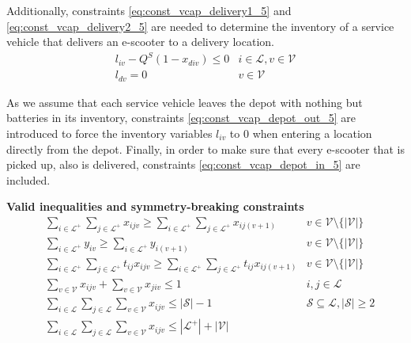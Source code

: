 Additionally, constraints \eqref{eq:const_vcap_delivery1_5} and \eqref{eq:const_vcap_delivery2_5} are needed to determine the inventory of a service vehicle that delivers an e-scooter to a delivery location. 
\begin{eqnarray}
    l_{iv} - Q^{S}(1-x_{div}) \leq 0 & i \in \mathcal{L}, v \in \mathcal{V} \label{eq:const_vcap_depot_out_5}\\
    l_{dv} = 0 & v \in \mathcal{V} \label{eq:const_vcap_depot_in_5}
\end{eqnarray}

As we assume that each service vehicle leaves the depot with nothing but batteries in its inventory, constraints \eqref{eq:const_vcap_depot_out_5} are introduced to force the inventory variables $l_{iv}$ to 0 when entering a location directly from the depot. Finally, in order to make sure that every e-scooter that is picked up, also is delivered, constraints \eqref{eq:const_vcap_depot_in_5} are included.

\textbf{Valid inequalities and symmetry-breaking constraints}
\begin{eqnarray}
	    & \displaystyle\sum_{i\in \mathcal{L}^+}\displaystyle\sum_{j\in \mathcal{L}^+} x_{ijv} \geq \displaystyle\sum_{i\in \mathcal{L}^+}\displaystyle\sum_{j\in \mathcal{L}^+} x_{ij(v+1)} & v \in \mathcal{V} \setminus\{| \mathcal{V}|\} \label{eq:const_number_of_arcs_5}\\
	    & \displaystyle\sum_{i\in \mathcal{L}^+} y_{iv} \geq \displaystyle\sum_{i\in \mathcal{L}^+} y_{i(v+1)} & v \in \mathcal{V} \setminus\{| \mathcal{V}|\} \label{eq:const_number_of_visits_5} \\
	    & \displaystyle\sum_{i\in \mathcal{L}^+}\displaystyle\sum_{j\in \mathcal{L}^+} t_{ij}x_{ijv} \geq \displaystyle\sum_{i\in \mathcal{L}^+}\displaystyle\sum_{j\in \mathcal{L}^+} t_{ij}x_{ij(v+1)} & v \in \mathcal{V} \setminus\{| \mathcal{V}|\} \label{eq:const_total_time_used_5}\\
	    & \displaystyle\sum_{v\in \mathcal{V}} x_{ijv} + \displaystyle\sum_{v\in \mathcal{V}} x_{jiv} \leq 1 & i,j \in \mathcal{L} \label{eq:const_back_and_forth_5}\\
	    & \displaystyle\sum_{i\in \mathcal{L}} \displaystyle\sum_{j\in \mathcal{L}} \displaystyle\sum_{v\in \mathcal{V}} x_{ijv} \leq |\mathcal{S}|-1  & \mathcal{S} \subseteq \mathcal{L}, |\mathcal{S}|\geq 2 \label{eq:const_subtour_in_set_5}\\
	    & \displaystyle\sum_{i\in \mathcal{L}} \displaystyle\sum_{j\in \mathcal{L}} \displaystyle\sum_{v\in \mathcal{V}} x_{ijv}  \leq |\mathcal{L}^+|+|\mathcal{V}| \label{eq:const_arcs_less_then_locations_5}
\end{eqnarray}

